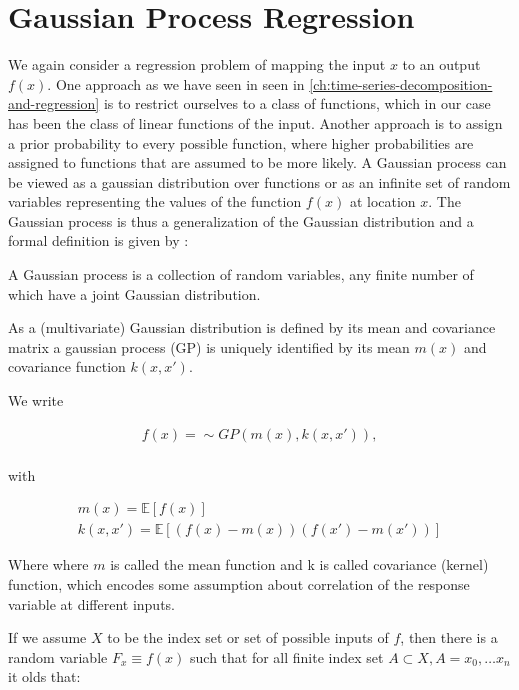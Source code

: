 \chapter{Gaussian Process Regression}\label{ch:gaussian-process-regression}

We again consider a regression problem of mapping the input $x$ to an output $f(x)$.
One approach as we have seen in seen in \ref{ch:time-series-decomposition-and-regression}
is to restrict ourselves to a
class of functions, which in our case has been the class of linear functions of the input.
Another approach is to assign a prior probability to every possible function, where higher
probabilities are assigned to functions that are assumed to be more likely.
A Gaussian process can be viewed as a gaussian distribution over functions or as an infinite set of random
variables representing the values of the function $f(x)$ at location $x$.
The Gaussian process is thus a generalization of the Gaussian distribution and a formal definition is given
by \citeauthor{rasmussen_gaussian_2006}:

\begin{definition}\label{def:GP}
 A Gaussian process is a collection of random variables, any finite number of which have a joint Gaussian distribution.
\end{definition}


As a (multivariate) Gaussian distribution is defined by its mean and covariance matrix a gaussian process (GP) is
uniquely identified by its mean $m(x)$ and covariance function $k(x,x')$.

We write

\begin{gather*}
    f(x) = \sim GP(m(x), k(x,x')), \\
\end{gather*}

with

\begin{gather*}
    m(x) = \mathbb{E}[f(x)] \\
    k(x,x') = \mathbb{E}[(f(x)-m(x))(f(x')-m(x'))]
\end{gather*}

Where where $m$ is called the mean function and k is called covariance (kernel) function, which encodes some assumption
about correlation of the response variable at different inputs.

If we assume $X$ to be the index set or set of possible inputs of $f$, then there is a random variable
$F_x \equiv f(x)$ such that for all finite index set $A \subset X, A={x_0, \dots x_n}$ it olds that:

